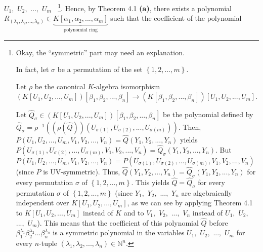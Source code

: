 \documentclass[numbers=enddot,12pt,final,onecolumn,notitlepage]{scrartcl}%
\begin{document}
$U_{1},$ $U_{2},$ $...,$ $U_{m}\ \ \ \ $\footnote{Okay, the ``symmetric'' part
may need an explanation.
\par
{}In fact, let $\sigma$ be a permutation of the set $\left\{
1,2,...,m\right\}  .$
\par
Let $\rho$ be the canonical $K$-algebra isomorphism $\left(  K\left[
U_{1},U_{2},...,U_{m}\right]  \right)  \left[  \beta_{1},\beta_{2}%
,...,\beta_{n}\right]  \rightarrow\left(  K\left[  \beta_{1},\beta
_{2},...,\beta_{n}\right]  \right)  \left[  U_{1},U_{2},...,U_{m}\right]  $.
\par
Let $\widehat{Q}_{\sigma}\in\left(  K\left[  U_{1},U_{2},...,U_{m}\right]
\right)  \left[  \beta_{1},\beta_{2},...,\beta_{n}\right]  $ be the polynomial
defined by $\widehat{Q}_{\sigma}=\rho^{-1}\left(  \left(  \rho\left(
\widehat{Q}\right)  \right)  \left(  U_{\sigma\left(  1\right)  }%
,U_{\sigma\left(  2\right)  },...,U_{\sigma\left(  m\right)  }\right)
\right)  .$ Then, $P\left(  U_{1},U_{2},...,U_{m},V_{1},V_{2},...,V_{n}%
\right)  =\widehat{Q}\left(  Y_{1},Y_{2},...,Y_{n}\right)  $ yields $P\left(
U_{\sigma\left(  1\right)  },U_{\sigma\left(  2\right)  },...,U_{\sigma\left(
m\right)  },V_{1},V_{2},...,V_{n}\right)  =\widehat{Q}_{\sigma}\left(
Y_{1},Y_{2},...,Y_{n}\right)  $. But $P\left(  U_{1},U_{2},...,U_{m}%
,V_{1},V_{2},...,V_{n}\right)  =P\left(  U_{\sigma\left(  1\right)
},U_{\sigma\left(  2\right)  },...,U_{\sigma\left(  m\right)  },V_{1}%
,V_{2},...,V_{n}\right)  $ (since $P$ is UV-symmetric). Thus, $\widehat{Q}%
\left(  Y_{1},Y_{2},...,Y_{n}\right)  =\widehat{Q}_{\sigma}\left(  Y_{1}%
,Y_{2},...,Y_{n}\right)  $ for every permutation $\sigma$ of $\left\{
1,2,...,m\right\}  $. This yields $\widehat{Q}=\widehat{Q}_{\sigma}$ for every
permutation $\sigma$ of $\left\{  1,2,...,m\right\}  $ (since $Y_{1},$
$Y_{2},$ $...,$ $Y_{n}$ are algebraically independent over $K\left[
U_{1},U_{2},...,U_{m}\right]  $, as we can see by applying Theorem 4.1 to
$K\left[  U_{1},U_{2},...,U_{m}\right]  $ instead of $K$ and to $V_{1},$
$V_{2},$ $...,$ $V_{n}$ instead of $U_{1},$ $U_{2},$ $...,$ $U_{m}$). This
means that the coefficient of this polynomial $\widehat{Q}$ before $\beta
_{1}^{\lambda_{1}}\beta_{2}^{\lambda_{2}}...\beta_{n}^{\lambda_{n}}$ is a
symmetric polynomial in the variables $U_{1},$ $U_{2},$ $...,$ $U_{m}$ for
every $n$-tuple $\left(  \lambda_{1},\lambda_{2},...,\lambda_{n}\right)
\in\mathbb{N}^{n}$.}. Hence, by Theorem 4.1 \textbf{(a)}, there exists a
polynomial $R_{\left(  \lambda_{1},\lambda_{2},...,\lambda_{n}\right)  }%
\in\underbrace{K\left[  \alpha_{1},\alpha_{2},...,\alpha_{m}\right]
}_{\text{polynomial ring}}$ such that the coefficient of the polynomial
\end{document}
